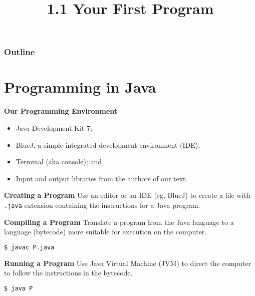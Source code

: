 \documentclass[8pt,a4paper,compress]{beamer}
\title{1.1 Your First Program}
\date{}
\begin{document}
\begin{frame}
\vfill
\titlepage
\end{frame}

\begin{frame}
\frametitle{Outline}
\tableofcontents
\end{frame}

\section{Programming in Java}
\begin{frame}[fragile]

\pause

\textbf{Our Programming Environment}
\begin{itemize}
\item Java Development Kit 7;  
\item BlueJ, a simple integrated development environment (IDE);
\item Terminal (aka console); and
\item Input and output libraries from the authors of our text. 
\end{itemize}

\pause
\smallskip

\textbf{Creating a Program} Use an editor or an IDE (eg, BlueJ) to create a file with \lstinline$.java$ extension containing the instructions for a Java program. 

\pause
\smallskip

\textbf{Compiling a Program} Translate a program from the Java language to a language (bytecode) more suitable for execution on the computer.

\begin{lstlisting}[language=bash]
$ javac P.java
\end{lstlisting}

\pause
\smallskip

\textbf{Running a Program} Use Java Virtual Machine (JVM) to direct the computer to follow the instructions in the bytecode.

\begin{lstlisting}[language=bash]
$ java P
\end{lstlisting}

\pause
\smallskip


\end{frame}
\end{document}
